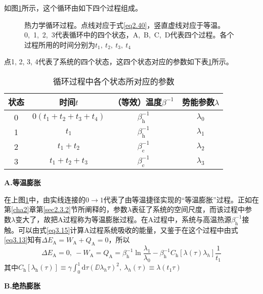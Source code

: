 如图\ref{p3.1}所示，这个循环由如下四个过程组成。
\begin{figure}[!htbp]
    \centering
    \def\svgwidth{0.6\columnwidth}
    
    \caption{热力学循环过程。点线对应于式\eqref{eq2.40}，竖直虚线对应于等温。0,\ 1,\ 2,\ 3代表循环中的四个状态，A,\ B,\ C,\ D代表四个过程。各个过程所用的时间分别为$t_1,\ t_2,\ t_3,\ t_4$}
    \label{p3.1}
\end{figure}
点1, 2, 3, 4代表了系统的四个状态，这四个状态对应的参数如下表\ref{t3.1}所示。
\begin{table}[!htbp]
    \centering
    \caption{循环过程中各个状态所对应的参数}
    \begin{tabular}{cccc}
    \hline
    状态 & 时间$t$ & （等效）温度$\beta^{-1}$      & 势能参数$\lambda$ \\ 
    \hline
    0                   & $0(t_1+t_2+t_3+t_4)$       & $\beta_{\mathrm{h}}^{-1}$  & $\lambda_0$   \\ 

    1                   & $t_1$   & $\beta_{\mathrm{h}}^{-1}$ & $\lambda_1$   \\ 

    2                   & $t_1+t_2$   & $\beta_{\mathrm{c}}^{-1}$ & $\lambda_2$   \\ 

    3                   & $t_1+t_2+t_3$   & $\beta_{\mathrm{c}}^{-1}$ & $\lambda_3$   \\ 
    \hline
    \end{tabular}
    \label{t3.1}
\end{table}

\begin{center}
    {\bfseries A.等温膨胀}
\end{center}

在上图\ref{p3.1}中，由实线连接的$0 \to 1$代表了由等温捷径实现的“等温膨胀”过程。正如在第\ref{cha2}章第\ref{sec2.3.2}节所阐释的，参数$\lambda$表征了系统的空间尺度，而该过程中参数$\lambda$变大了，故把A过程称为等温膨胀过程。在A过程中，系统与高温热源$\beta_\mathrm{h}^{-1}$接触。可以由式\eqref{eq3.15}计算A过程系统吸收的能量，又鉴于在这个过程中由式\eqref{eq3.13}知有$\Delta E_{\mathrm{A}} = W_{\mathrm{A}} + Q_{\mathrm{A}}=0$，所以
\begin{equation}
    \Delta E_{\mathrm{A}}=0,\ -W_{\mathrm{A}}=Q_{\mathrm{A}} = \beta_{\mathrm{h}}^{-1} \ln{\frac{\lambda_1}{\lambda_0}} - \beta_{\mathrm{h}}^{-1} C_{\mathrm{h}} [\lambda(\tau)\lambda_{h}] \frac{1}{t_1}     
    \label{eq3.16}
\end{equation}
其中$C_{\mathrm{h}} [\lambda_{\mathrm{h}}(\tau)] \equiv \gamma \int_{0}^{1} \mathrm{d} \tau \left(\DD{\lambda_{h}}{\tau}\right)^2,\ \lambda_{h}(\tau)\equiv\lambda({t_1 \tau})$
\begin{center}
    {\bfseries B.绝热膨胀}
\end{center}

